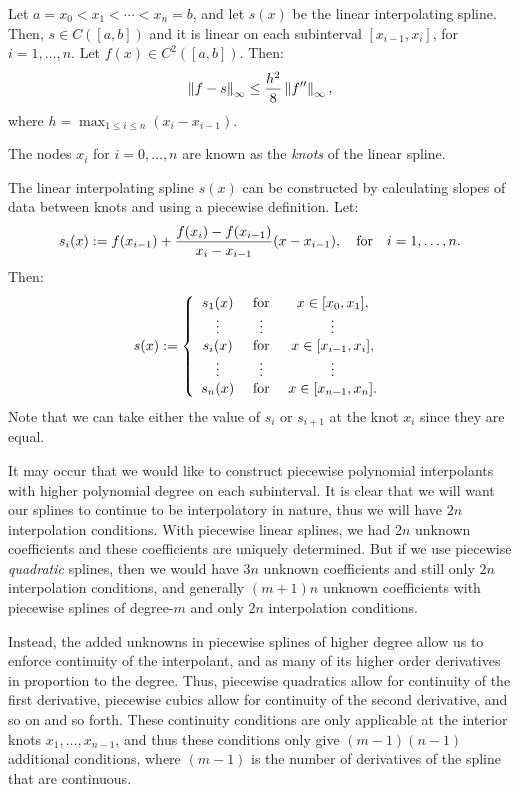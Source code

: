 \begin{theorem}\label{theorem:LinearSplineConvergence}
Let $a=x_0<x_1<\cdots<x_n=b$, and let $s(x)$ be the linear interpolating spline. Then, $s\in C([a,b])$ and it is linear on each subinterval $[x_{i-1},x_i]$, for $i=1,\ldots,n$. Let $f(x)\in C^2([a,b])$. Then:
\[
\left\|{f-s}\right\|_\infty \le \dfrac{h^2}{8}\left\|{f''}\right\|_\infty,
\]
where $\displaystyle h=\max_{1\le i\le n}(x_i-x_{i-1})$.
\end{theorem}
The nodes $x_i$ for $i=0,\ldots,n$ are known as the {\em knots} of the linear spline.

The linear interpolating spline $s(x)$ can be constructed by calculating slopes of data between knots and using a piecewise definition. Let:
\[
s_i(x) := f(x_{i-1}) + \dfrac{f(x_i)-f(x_{i-1})}{x_i-x_{i-1}}(x-x_{i-1}),\quad{\rm for}\quad i=1,\ldots,n.
\]
Then:
\[
s(x) := \left\{ \begin{array}{ccc}
s_1(x) & \hbox{ for } & x\in[x_0,x_1],\\
\vdots & \vdots & \vdots\\
s_i(x) & \hbox{ for } & x\in[x_{i-1},x_i],\\
\vdots & \vdots & \vdots\\
s_n(x) & \hbox{ for } & x\in[x_{n-1},x_n].\\
\end{array}\right.
\]
Note that we can take either the value of $s_i$ or $s_{i+1}$ at the knot $x_i$ since they are equal.

It may occur that we would like to construct piecewise polynomial interpolants with higher polynomial degree on each subinterval. It is clear that we will want our splines to continue to be interpolatory in nature, thus we will have $2n$ interpolation conditions. With piecewise linear splines, we had $2n$ unknown coefficients and these coefficients are uniquely determined. But if we use piecewise {\em quadratic} splines, then we would have $3n$ unknown coefficients and still only $2n$ interpolation conditions, and generally $(m+1)n$ unknown coefficients with piecewise splines of degree-$m$ and only $2n$ interpolation conditions.

Instead, the added unknowns in piecewise splines of higher degree allow us to enforce continuity of the interpolant, and as many of its higher order derivatives in proportion to the degree. Thus, piecewise quadratics allow for continuity of the first derivative, piecewise cubics allow for continuity of the second derivative, and so on and so forth. These continuity conditions are only applicable at the interior knots $x_1,\ldots,x_{n-1}$, and thus these conditions only give $(m-1)(n-1)$ additional conditions, where $(m-1)$ is the number of derivatives of the spline that are continuous.

